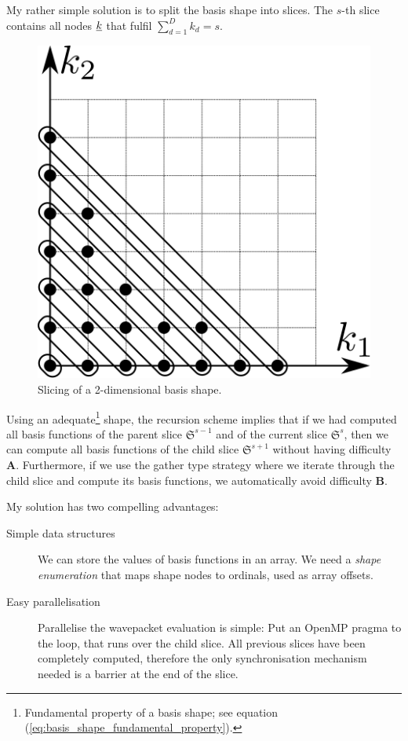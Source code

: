 \documentclass{article}
\begin{document}
My rather simple solution is to split the basis shape into slices.  The
\(s\)-th slice contains all nodes \(\underline{k}\) that fulfil
\( \sum_{d=1}^{D} k_d = s \).

\begin{figure}[H]
  \centering
  \includegraphics{shape_slicing}
  \caption{Slicing of a 2-dimensional basis shape.}
\end{figure}

Using an adequate\footnote{Fundamental property of a basis shape; see equation
  (\ref{eq:basis_shape_fundamental_property}).} shape,
the recursion scheme implies that if we had computed all basis
functions of the parent slice \( \mathfrak{S}^{s-1} \) and of the current
slice \( \mathfrak{S}^{s} \), then we can compute all basis functions of
the child slice \( \mathfrak{S}^{s+1} \) without having difficulty
\textbf{A}. Furthermore, if we use the gather type strategy where we
iterate through the child slice and compute its basis functions, we
automatically avoid difficulty \textbf{B}.

My solution has two compelling advantages:
\begin{description}
\item[Simple data structures] We can store the values of basis functions in
  an array. We need a \emph{shape enumeration}
  that maps shape nodes to ordinals, used as array offsets.
\item[Easy parallelisation] Parallelise the wavepacket evaluation is simple:
  Put an OpenMP pragma to the loop, that runs over the child slice.
  All previous slices have been completely computed,
  therefore the only synchronisation mechanism
  needed is a barrier at the end of the slice.
\end{description}
\end{document}
